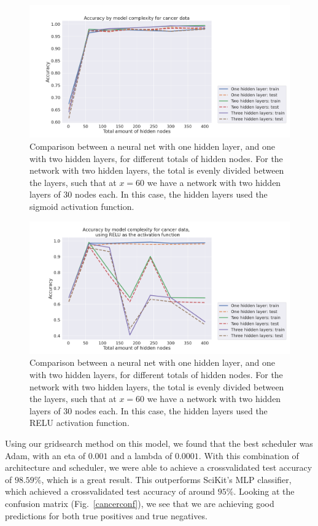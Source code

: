 \documentclass[onecolumn,10pt,cleanfoot]{asme2ej}
\begin{document}
\begin{figure}[h]
\centerline{\includegraphics[width=6in]{figure/cancerarchcompsigmoid.png}}
\caption{Comparison between a neural net with one hidden layer, and one with two hidden layers, for different totals of hidden nodes. For the network with two hidden layers, the total is evenly divided between the layers, such that at $x = 60$ we have a network with two hidden layers of 30 nodes each. In this case, the hidden layers used the sigmoid activation function.}
\label{cancerarchcompsigmoid}
\end{figure}

\begin{figure}[h]
\centerline{\includegraphics[width=6in]{figure/cancerarchcomp.png}}
\caption{Comparison between a neural net with one hidden layer, and one with two hidden layers, for different totals of hidden nodes. For the network with two hidden layers, the total is evenly divided between the layers, such that at $x = 60$ we have a network with two hidden layers of 30 nodes each. In this case, the hidden layers used the RELU activation function.}
\label{cancerarchcomp}
\end{figure}

Using our gridsearch method on this model, we found that the best scheduler was Adam, with an eta of $0.001$ and a lambda of $0.0001$. With this combination of architecture and scheduler, we were able to achieve a crossvalidated test accuracy of $98.59\%$, which is a great result. This outperforms SciKit's MLP classifier, which achieved a crossvalidated test accuracy of around $95\%$. Looking at the confusion matrix (Fig.~\ref{cancerconf}), we see that we are achieving good predictions for both true positives and true negatives.
\end{document}
